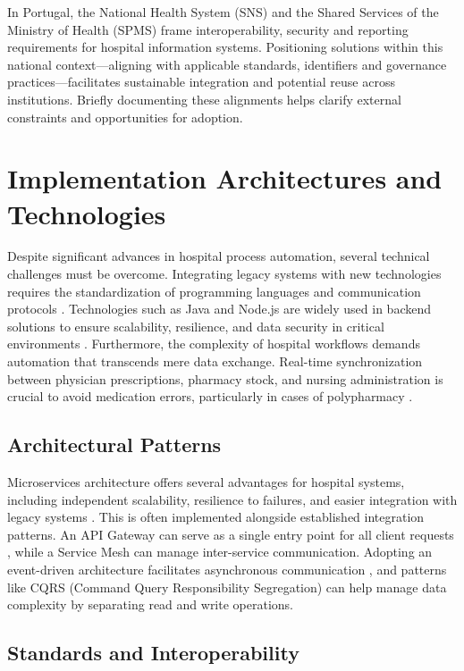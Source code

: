 In Portugal, the National Health System (SNS) and the Shared Services of the Ministry of Health (SPMS) frame interoperability, security and reporting requirements for hospital information systems. Positioning solutions within this national context—aligning with applicable standards, identifiers and governance practices—facilitates sustainable integration and potential reuse across institutions. Briefly documenting these alignments helps clarify external constraints and opportunities for adoption.

\section{Implementation Architectures and Technologies}

Despite significant advances in hospital process automation, several technical challenges must be overcome. Integrating legacy systems with new technologies requires the standardization of programming languages and communication protocols \cite{stanojevic2023conceptualizing}. Technologies such as Java and Node.js are widely used in backend solutions to ensure scalability, resilience, and data security in critical environments \cite{nkenyereye2016}. Furthermore, the complexity of hospital workflows demands automation that transcends mere data exchange. Real-time synchronization between physician prescriptions, pharmacy stock, and nursing administration is crucial to avoid medication errors, particularly in cases of polypharmacy \citep{Tukukino2022, falconer2021pharmacist}.

\subsection{Architectural Patterns}

Microservices architecture offers several advantages for hospital systems, including independent scalability, resilience to failures, and easier integration with legacy systems \cite{shermock2023, vaghasiya2023, newman2021}. This is often implemented alongside established integration patterns. An API Gateway can serve as a single entry point for all client requests \cite{newman2021}, while a Service Mesh can manage inter-service communication. Adopting an event-driven architecture facilitates asynchronous communication \cite{fowler2018}, and patterns like CQRS (Command Query Responsibility Segregation) can help manage data complexity by separating read and write operations.

\subsection{Standards and Interoperability}

